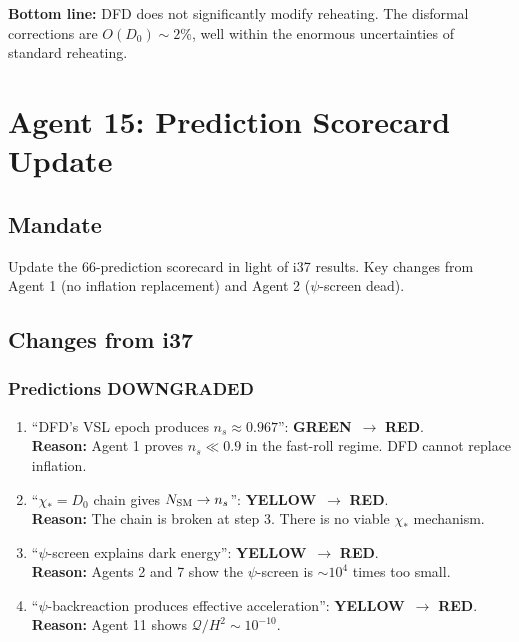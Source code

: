 \documentclass[11pt,a4paper]{article}
\newcommand{\GREEN}{\textcolor{dfdgreen}{\textbf{GREEN}}}
\newcommand{\YELLOW}{\textcolor{dfdyellow}{\textbf{YELLOW}}}
\newcommand{\RED}{\textcolor{dfdred}{\textbf{RED}}}
\begin{document}
\textbf{Bottom line:} DFD does not significantly modify reheating. The disformal corrections are $O(D_0) \sim 2\%$, well within the enormous uncertainties of standard reheating.

\newpage
\section{Agent 15: Prediction Scorecard Update}
\label{sec:agent15}

\subsection{Mandate}

Update the 66-prediction scorecard in light of i37 results. Key changes from Agent 1 (no inflation replacement) and Agent 2 ($\psi$-screen dead).

\subsection{Changes from i37}

\subsubsection{Predictions DOWNGRADED}

\begin{enumerate}
\item[\textbf{P-VSL1}] ``DFD's VSL epoch produces $n_s \approx 0.967$'': \GREEN\ $\to$ \RED. \\
\textbf{Reason:} Agent 1 proves $n_s \ll 0.9$ in the fast-roll regime. DFD cannot replace inflation.

\item[\textbf{P-VSL2}] ``$\chi_* = D_0$ chain gives $N_{\rm SM} \to n_s$'': \YELLOW\ $\to$ \RED. \\
\textbf{Reason:} The chain is broken at step 3. There is no viable $\chi_*$ mechanism.

\item[\textbf{P-DE1}] ``$\psi$-screen explains dark energy'': \YELLOW\ $\to$ \RED. \\
\textbf{Reason:} Agents 2 and 7 show the $\psi$-screen is $\sim 10^4$ times too small.

\item[\textbf{P-DE2}] ``$\psi$-backreaction produces effective acceleration'': \YELLOW\ $\to$ \RED. \\
\textbf{Reason:} Agent 11 shows $\mathcal{Q}/H^2 \sim 10^{-10}$.
\end{enumerate}
\end{document}
